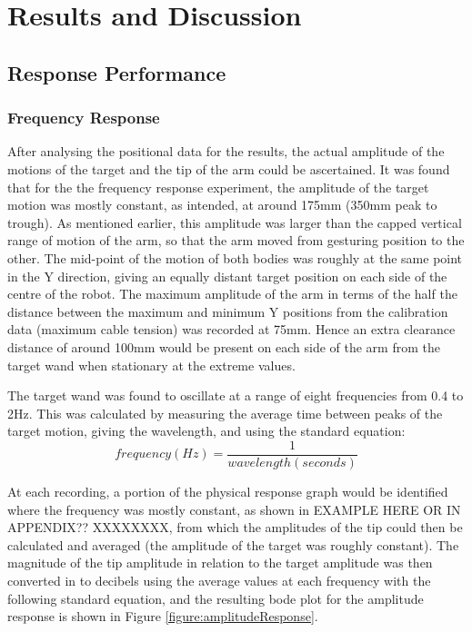 \documentclass[11pt]{article}
\begin{document}
\pagebreak
\section{Results and Discussion}
\subsection{Response Performance}
\subsubsection{Frequency Response}

After analysing the positional data for the results, the actual amplitude of the motions of the target and the tip of the arm could be ascertained. It was found that for the the frequency response experiment, the amplitude of the target motion was mostly constant, as intended, at around 175mm (350mm peak to trough). As mentioned earlier, this amplitude was larger than the capped vertical range of motion of the arm, so that the arm moved from gesturing position to the other. The mid-point of the motion of both bodies was roughly at the same point in the Y direction, giving an equally distant target position on each side of the centre of the robot. The maximum amplitude of the arm in terms of the half the distance between the maximum and minimum Y positions from the calibration data (maximum cable tension) was recorded at 75mm. Hence an extra clearance distance of around 100mm would be present on each side of the arm from the target wand when stationary at the extreme values. 

The target wand was found to oscillate at a range of eight frequencies from 0.4 to 2Hz. This was calculated by measuring the average time between peaks of the target motion, giving the wavelength, and using the standard equation:
\begin{equation}
frequency(Hz) = \frac{1}{wavelength(seconds)}
\end{equation}

At each recording, a portion of the physical response graph would be identified where the frequency was mostly constant, as shown in EXAMPLE HERE OR IN APPENDIX?? XXXXXXXX, from which the amplitudes of the tip could then be calculated and averaged (the amplitude of the target was roughly constant). The magnitude of the tip amplitude in relation to the target amplitude was then converted in to decibels using the average values at each frequency with the following standard equation, and the resulting bode plot for the amplitude response is shown in Figure \ref{figure:amplitudeResponse}.
\end{document}
